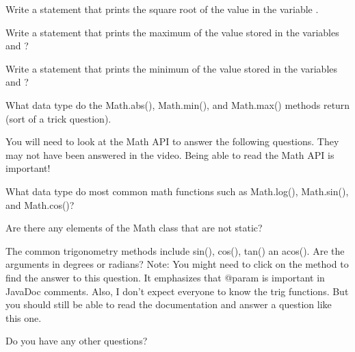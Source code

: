 \documentclass[letterpaper,12pt]{exam}
\begin{document}
\begin{questions}
\begin{samepage}
    \question Write a statement that prints the square root of the value in the variable .
    \vspace{5mm}
\end{samepage}

\begin{samepage}
    \question Write a statement that prints the maximum of the value stored in the variables  and ?
    \vspace{5mm}
\end{samepage}

\begin{samepage}
    \question Write a statement that prints the minimum of the value stored in the variables  and ?
    \vspace{5mm}
\end{samepage}


\begin{samepage}
    \question What data type do the Math.abs(), Math.min(), and Math.max() methods return (sort of a trick question).
    \vspace{5mm}
\end{samepage}

\noindent You will need to look at the Math API to answer the following questions.  They may not have been answered in the video.  Being able to read the Math API is important!

\begin{samepage}
    \question What data type do most common math functions such as Math.log(), Math.sin(), and Math.cos()?
    \vspace{5mm}
\end{samepage}

\begin{samepage}
    \question Are there any elements of the Math class that are not static?
    \vspace{5mm}
\end{samepage}

\begin{samepage}
    \question The common trigonometry methods include sin(), cos(), tan() an acos().  Are the arguments in degrees or radians?  Note: You might need to click on the method to find the answer to this question.  It emphasizes that @param is important in JavaDoc comments.  Also, I don't expect everyone to know the trig functions.  But you should still be able to read the documentation and answer a question like this one.
    \vspace{5mm}
\end{samepage}


\begin{samepage}
	\question Do you have any other questions?
	\vspace{30mm}
\end{samepage}

\end{questions}
\end{document}
